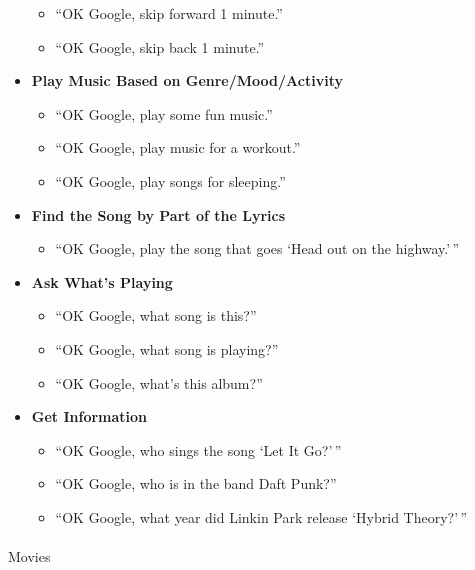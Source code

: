 \documentclass[
  a4paper,
]{article}
\makeatletter
\let\oldparagraph\paragraph
\renewcommand{\paragraph}{
    \@ifstar
      \xxxParagraphStar
      \xxxParagraphNoStar
  }
\newcommand{\xxxParagraphStar}[1]{\oldparagraph*{#1}\mbox{}}
\newcommand{\xxxParagraphNoStar}[1]{\oldparagraph{#1}\mbox{}}
\providecommand{\tightlist}{%
  \setlength{\itemsep}{0pt}\setlength{\parskip}{0pt}}\usepackage{longtable,booktabs,array}
\makeatother
\begin{document}
\begin{itemize}
  \begin{itemize}
  \tightlist
  \item
    ``OK Google, skip forward 1 minute.''
  \item
    ``OK Google, skip back 1 minute.''
  \end{itemize}
\item
  \textbf{Play Music Based on Genre/Mood/Activity}

  \begin{itemize}
  \tightlist
  \item
    ``OK Google, play some fun music.''
  \item
    ``OK Google, play music for a workout.''
  \item
    ``OK Google, play songs for sleeping.''
  \end{itemize}
\item
  \textbf{Find the Song by Part of the Lyrics}

  \begin{itemize}
  \tightlist
  \item
    ``OK Google, play the song that goes `Head out on the highway.'\,''
  \end{itemize}
\item
  \textbf{Ask What's Playing}

  \begin{itemize}
  \tightlist
  \item
    ``OK Google, what song is this?''
  \item
    ``OK Google, what song is playing?''
  \item
    ``OK Google, what's this album?''
  \end{itemize}
\item
  \textbf{Get Information}

  \begin{itemize}
  \tightlist
  \item
    ``OK Google, who sings the song `Let It Go?'\,''
  \item
    ``OK Google, who is in the band Daft Punk?''
  \item
    ``OK Google, what year did Linkin Park release `Hybrid Theory?'\,''
  \end{itemize}
\end{itemize}

\paragraph{Movies}\label{movies}
\end{document}
